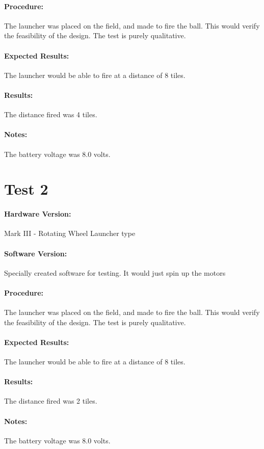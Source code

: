 \documentclass[12pt,letterpaper]{article}
\begin{document}
	\paragraph{Procedure:} The launcher was placed on the field, and made to fire the ball. This would verify the feasibility of the design. The test is purely qualitative.
	\paragraph{Expected Results:} The launcher would be able to fire at a distance of 8 tiles.
	\paragraph{Results:} The distance fired was 4 tiles.
	
	\paragraph{Notes:} The battery voltage was 8.0 volts.
		
	\section{Test 2}
	\paragraph{Hardware Version:}Mark III - Rotating Wheel Launcher type
	\paragraph{Software Version:}Specially created software for testing. It would just spin up the motors
	
	\paragraph{Procedure:} The launcher was placed on the field, and made to fire the ball. This would verify the feasibility of the design. The test is purely qualitative.
	\paragraph{Expected Results:} The launcher would be able to fire at a distance of 8 tiles.
	\paragraph{Results:} The distance fired was 2 tiles.
	
	\paragraph{Notes:} The battery voltage was 8.0 volts.
	
\end{document}
